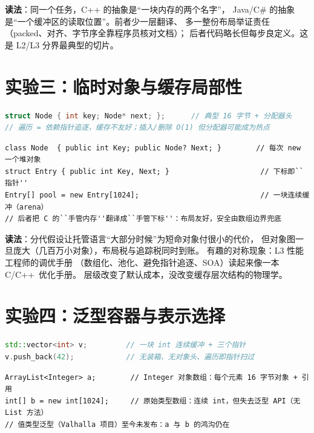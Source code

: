 \documentclass[12pt,a4paper,fontset=fandol]{ctexbook}
\newcommand{\Cplus}[1]{C++\,#1}
\begin{document}
\textbf{读法}：同一个任务，C++ 的抽象是``一块内存的两个名字''，
Java/C\# 的抽象是``一个缓冲区的读取位置''。前者少一层翻译、
多一整份布局举证责任（packed、对齐、字节序全靠程序员核对文档）；
后者代码略长但每步良定义。这是 L2/L3 分界最典型的切片。

\section{实验三：临时对象与缓存局部性}

\begin{lstlisting}[language=C++,caption={C++ 链表节点：每个元素一次 new，指针跳跃}]
struct Node { int key; Node* next; };      // 典型 16 字节 + 分配器头
// 遍历 = 依赖指针追逐，缓存不友好；插入/删除 O(1) 但分配器可能成为热点
\end{lstlisting}

\begin{lstlisting}[style=csharpstyle,caption={同一算法在 C\# 的两种写法体现两种层级}]
class Node  { public int Key; public Node? Next; }        // 每次 new 一个堆对象
struct Entry { public int Key, Next; }                     // 下标即``指针''
Entry[] pool = new Entry[1024];                            // 一块连续缓冲（arena）
// 后者把 C 的``手管内存''翻译成``手管下标''：布局友好，安全由数组边界兜底
\end{lstlisting}

\textbf{读法}：分代假设让托管语言``大部分时候''为短命对象付很小的代价，
但对象图一旦庞大（几百万小对象），布局税与追踪税同时到账。
有趣的对称现象：L3 性能工程师的调优手册
（数组化、池化、避免指针追逐、SOA）读起来像一本 C/\allowbreak{}\Cplus{} 优化手册。
层级改变了默认成本，没改变缓存层次结构的物理学。

\section{实验四：泛型容器与表示选择}

\begin{lstlisting}[language=C++,caption={vector 的 int：就是 C 数组，无任何额外元数据}]
std::vector<int> v;         // 一块 int 连续缓冲 + 三个指针
v.push_back(42);            // 无装箱、无对象头、遍历即指针扫过
\end{lstlisting}

\begin{lstlisting}[style=javastyle,caption={Java：两种容器是两个极端}]
ArrayList<Integer> a;        // Integer 对象数组：每个元素 16 字节对象 + 引用
int[] b = new int[1024];     // 原始类型数组：连续 int，但失去泛型 API（无 List 方法）
// 值类型泛型（Valhalla 项目）至今未发布：a 与 b 的鸿沟仍在
\end{lstlisting}
\end{document}
